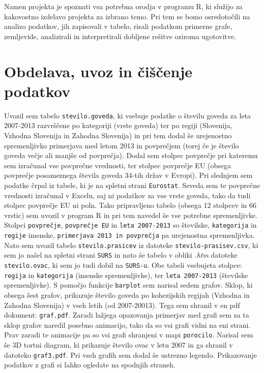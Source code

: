 \documentclass[11pt,a4paper]{article}
\begin{document}
\noindent Namen projekta je spoznati vsa potrebna orodja v programu R, ki služijo za kakovostno izdelavo projekta za izbrano temo. Pri tem se bomo osredotočili na analizo podatkov, jih zapisovali v tabelo, risali podatkom primerne grafe, zemljevide, analizirali in interpretirali dobljene rešitve oziroma ugotovitve.

\section{Obdelava, uvoz in čiščenje podatkov}
Uvozil sem tabelo \verb|stevilo.goveda|, ki vsebuje podatke o številu goveda za leta 2007-2013 razvrščene po kategoriji (vrste goveda) ter po regiji (Slovenija, Vzhodna Slovenija in Zahodna Slovenija) in pri tem dodal še urejenostno spremenljivko primerjava med letom 2013 in povprečjem (torej če je število goveda večje ali manjše od povprečja). Dodal sem stolpec povprečje pri kateremu sem izračunal vse povprečne vrednosti, ter stolpec povprečje EU (obsega povprečje posameznega števila goveda 34-tih držav v Evropi). Pri slednjem sem podatke črpal iz tabele, ki je na spletni strani \verb|Eurostat|. Seveda sem te povprečne vrednosti izračunal v Excelu, saj ni podatkov za vse vrste goveda, tako da tudi stolpec povprečje EU ni poln. Tako pripravljeno tabelo (obsega 12 stolpcev in 66 vrstic) sem uvozil v program R in pri tem navedel še vse potrebne spremenljivke. Stolpci \verb|povprečje|, \verb|povprečje EU| in \verb|leta 2007-2013| so številske, \verb|kategorija| in \verb|regije| imenske, \verb|primerjava 2013 in povprečja| pa urejenostna spremenljivka.
Nato sem uvozil tabelo \verb|stevilo.prasicev| iz datoteke \verb|stevilo-prasisev.csv|, ki sem jo našel na spletni strani \verb|SURS| in nato še tabelo v obliki \textit{.htm} datoteke \verb|stevilo.ovac|, ki sem jo tudi dobil na \verb|SURS-u|. Obe tabeli vsebujeta stolpce: \verb|regija| in \verb|kategorija|  (imenske spremenljivke), ter \verb|leta 2007-2013| (številske spremenljivke).
\newline
S pomočjo funkcije \verb|barplot| sem narisal sedem grafov. Sklop, ki obsega šest grafov, prikazuje število goveda po kohezijskih regijah (Vzhodna in Zahodna Slovenija) v vseh letih (od 2007-20013). Tega sem shranil v en pdf dokument: \verb|graf.pdf|. Zaradi lažjega opazovanja primerjav med grafi sem za ta sklop grafov naredil posebno animacijo, tako da so vsi grafi vidni na eni strani. Prav zaradi te animacije pa so vsi grafi shranjeni v mapi \verb|porocilo|. Narisal sem še 3D tortni diagram, ki prikazuje število ovac v letu 2007 in ga shranil v datoteko \verb|graf3.pdf|. Pri vseh grafih sem dodal še ustrezno legendo. Prikazovanje podatkov z grafi si lahko ogledate na spodnjih straneh.
\end{document}
